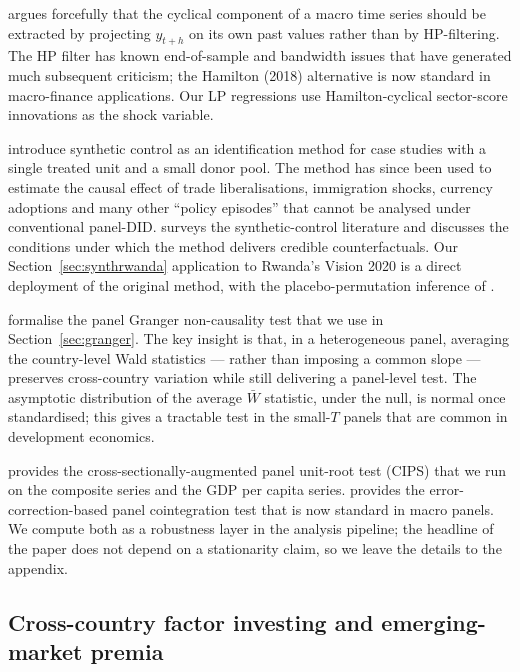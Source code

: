 \textcite{hamilton2018filter} argues forcefully that the cyclical component of a macro time series should be extracted by projecting $y_{t+h}$ on its own past values rather than by HP-filtering. The HP filter has known end-of-sample and bandwidth issues that have generated much subsequent criticism; the Hamilton (2018) alternative is now standard in macro-finance applications. Our LP regressions use Hamilton-cyclical sector-score innovations as the shock variable.

\textcite{abadiediamondhainmueller2010} introduce synthetic control as an identification method for case studies with a single treated unit and a small donor pool. The method has since been used to estimate the causal effect of trade liberalisations, immigration shocks, currency adoptions and many other ``policy episodes'' that cannot be analysed under conventional panel-DID. \textcite{abadie2021} surveys the synthetic-control literature and discusses the conditions under which the method delivers credible counterfactuals. Our Section~\ref{sec:synthrwanda} application to Rwanda's Vision 2020 is a direct deployment of the original method, with the placebo-permutation inference of \textcite{abadiediamondhainmueller2010}.

\textcite{dumitrescuhurlin2012} formalise the panel Granger non-causality test that we use in Section~\ref{sec:granger}. The key insight is that, in a heterogeneous panel, averaging the country-level Wald statistics --- rather than imposing a common slope --- preserves cross-country variation while still delivering a panel-level test. The asymptotic distribution of the average $\bar W$ statistic, under the null, is normal once standardised; this gives a tractable test in the small-$T$ panels that are common in development economics.

\textcite{pesaran2007} provides the cross-sectionally-augmented panel unit-root test (CIPS) that we run on the composite series and the GDP per capita series. \textcite{westerlund2007} provides the error-correction-based panel cointegration test that is now standard in macro panels. We compute both as a robustness layer in the analysis pipeline; the headline of the paper does not depend on a stationarity claim, so we leave the details to the appendix.

\subsection{Cross-country factor investing and emerging-market premia}

